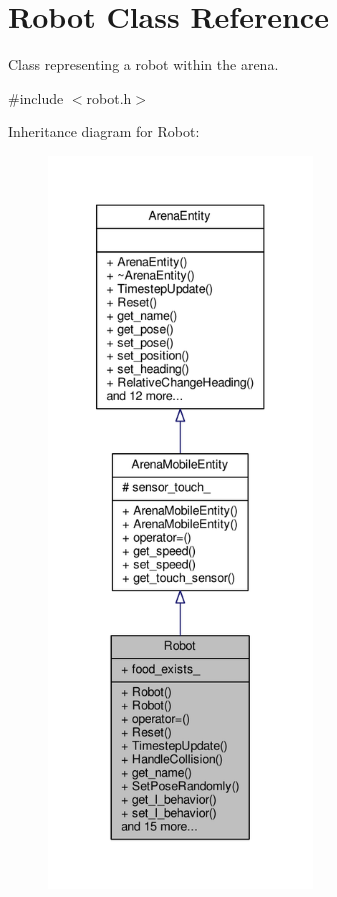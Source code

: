 \hypertarget{classRobot}{}\section{Robot Class Reference}
\label{classRobot}


Class representing a robot within the arena.  




{\ttfamily \#include $<$robot.\+h$>$}



Inheritance diagram for Robot\+:\nopagebreak
\begin{figure}[H]
\begin{center}
\leavevmode
\includegraphics[height=550pt]{classRobot__inherit__graph}
\end{center}
\end{figure}



